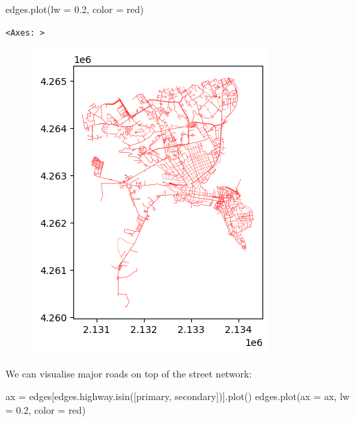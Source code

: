 \documentclass[
  letterpaper,
  DIV=11,
  numbers=noendperiod]{scrreprt}
\newenvironment{Shaded}{\begin{snugshade}}{\end{snugshade}}
\newcommand{\FloatTok}[1]{\textcolor[rgb]{0.68,0.00,0.00}{#1}}
\newcommand{\NormalTok}[1]{\textcolor[rgb]{0.00,0.23,0.31}{#1}}
\newcommand{\OperatorTok}[1]{\textcolor[rgb]{0.37,0.37,0.37}{#1}}
\newcommand{\StringTok}[1]{\textcolor[rgb]{0.13,0.47,0.30}{#1}}
\begin{document}
\begin{Shaded}
\begin{Highlighting}[]
\NormalTok{edges.plot(lw }\OperatorTok{=} \FloatTok{0.2}\NormalTok{, color }\OperatorTok{=} \StringTok{\textquotesingle{}red\textquotesingle{}}\NormalTok{)}
\end{Highlighting}
\end{Shaded}

\begin{verbatim}
<Axes: >
\end{verbatim}

\begin{figure}[H]

{\centering \includegraphics{labs/w07_OSM_files/figure-pdf/cell-22-output-2.png}

}

\end{figure}

We can visualise major roads on top of the street network:

\begin{Shaded}
\begin{Highlighting}[]
\NormalTok{ax }\OperatorTok{=}\NormalTok{ edges[edges.highway.isin([}\StringTok{\textquotesingle{}primary\textquotesingle{}}\NormalTok{, }\StringTok{\textquotesingle{}secondary\textquotesingle{}}\NormalTok{])].plot()}
\NormalTok{edges.plot(ax }\OperatorTok{=}\NormalTok{ ax, lw }\OperatorTok{=} \FloatTok{0.2}\NormalTok{, color }\OperatorTok{=} \StringTok{\textquotesingle{}red\textquotesingle{}}\NormalTok{)}
\end{Highlighting}
\end{Shaded}
\end{document}
